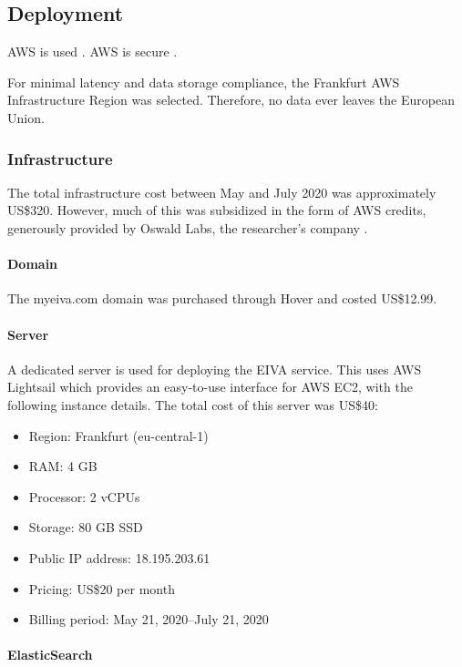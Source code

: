 \documentclass{article}
\begin{document}
\subsection{Deployment}

AWS is used \cite{shokeen_deploying_2019}. AWS is secure \cite{narula_cloud_2015}.

For minimal latency and data storage compliance, the Frankfurt AWS Infrastructure Region was selected. Therefore, no data ever leaves the European Union.

\subsubsection{Infrastructure}

The total infrastructure cost between May and July 2020 was approximately US\$320. However, much of this was subsidized in the form of AWS credits, generously provided by Oswald Labs, the researcher's company \cite{noauthor_oswald_nodate}.

\paragraph{Domain}

The myeiva.com domain was purchased through Hover and costed US\$12.99.

\paragraph{Server}

A dedicated server is used for deploying the EIVA service. This uses AWS Lightsail which provides an easy-to-use interface for AWS EC2, with the following instance details. The total cost of this server was US\$40:

\begin{itemize}
	\item Region: Frankfurt (eu-central-1)
	\item RAM: 4 GB
	\item Processor: 2 vCPUs
	\item Storage: 80 GB SSD
	\item Public IP address: 18.195.203.61
	\item Pricing: US\$20 per month
	\item Billing period: May 21, 2020--July 21, 2020
\end{itemize}

\paragraph{ElasticSearch}
\end{document}
